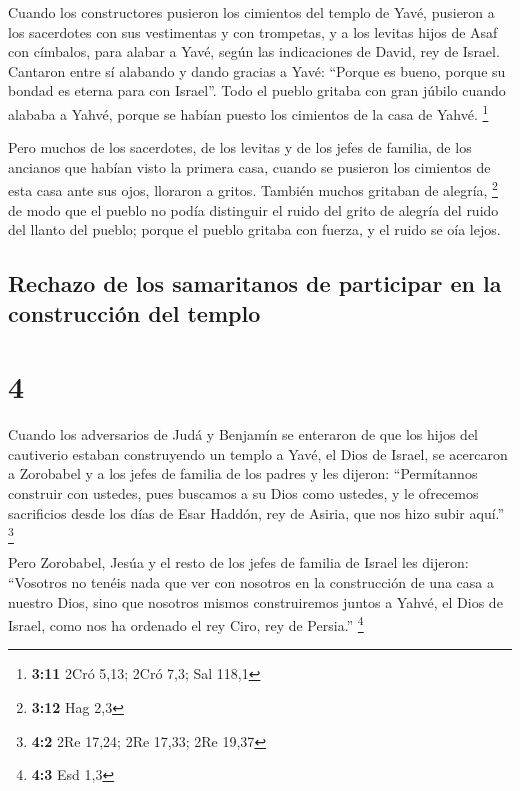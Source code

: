  Cuando los constructores pusieron los cimientos del
templo de Yavé, pusieron a los sacerdotes con sus vestimentas y con
trompetas, y a los levitas hijos de Asaf con címbalos, para alabar a
Yavé, según las indicaciones de David, rey de Israel. 
Cantaron entre sí alabando y dando gracias a Yavé: ``Porque es bueno,
porque su bondad es eterna para con Israel''. Todo el pueblo gritaba con
gran júbilo cuando alababa a Yahvé, porque se habían puesto los
cimientos de la casa de Yahvé. \footnote{\textbf{3:11} 2Cró 5,13; 2Cró
  7,3; Sal 118,1}

 Pero muchos de los sacerdotes, de los levitas y de los
jefes de familia, de los ancianos que habían visto la primera casa,
cuando se pusieron los cimientos de esta casa ante sus ojos, lloraron a
gritos. También muchos gritaban de alegría, \footnote{\textbf{3:12} Hag
  2,3}  de modo que el pueblo no podía distinguir el
ruido del grito de alegría del ruido del llanto del pueblo; porque el
pueblo gritaba con fuerza, y el ruido se oía lejos.

\hypertarget{rechazo-de-los-samaritanos-de-participar-en-la-construcciuxf3n-del-templo}{%
\subsection{Rechazo de los samaritanos de participar en la construcción
del
templo}\label{rechazo-de-los-samaritanos-de-participar-en-la-construcciuxf3n-del-templo}}

\hypertarget{section-3}{%
\section{4}\label{section-3}}

 Cuando los adversarios de Judá y Benjamín se enteraron de
que los hijos del cautiverio estaban construyendo un templo a Yavé, el
Dios de Israel,  se acercaron a Zorobabel y a los jefes de
familia de los padres y les dijeron: ``Permítannos construir con
ustedes, pues buscamos a su Dios como ustedes, y le ofrecemos
sacrificios desde los días de Esar Haddón, rey de Asiria, que nos hizo
subir aquí.'' \footnote{\textbf{4:2} 2Re 17,24; 2Re 17,33; 2Re 19,37}

 Pero Zorobabel, Jesúa y el resto de los jefes de familia
de Israel les dijeron: ``Vosotros no tenéis nada que ver con nosotros en
la construcción de una casa a nuestro Dios, sino que nosotros mismos
construiremos juntos a Yahvé, el Dios de Israel, como nos ha ordenado el
rey Ciro, rey de Persia.'' \footnote{\textbf{4:3} Esd 1,3}

